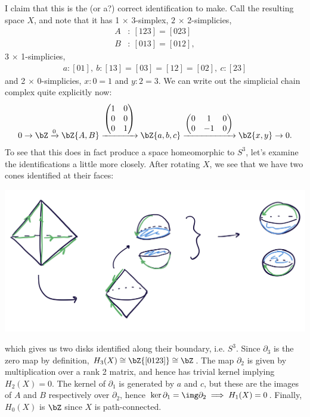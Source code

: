 \begin{homework}[e]
\begin{prf}
    I claim that this is the (or a?) correct identification to make. Call the resulting space $X$, and note that it has 1 $\times$ 3-simplex, $2$ $\times$ 2-simplicies,
    \begin{align*}
      A&: ~[123] = [023] \\
      B&: ~[013] = [012],
    \end{align*}
    3 $\times$ 1-simplicies,
    \begin{align*}
      a:[01], ~ b: [13] = [03] = [12] = [02], ~ c:[23]
    \end{align*}
    and 2 $\times$ 0-simplicies, $x: 0 = 1$ and $y: 2 = 3$. We can write out the simplicial chain complex quite explicitly now:
    \begin{align*}
      0 \to \bZ \xrightarrow{0} \bZ\{A,B\} \xrightarrow{
        \begin{pmatrix}	1 & 0 \\ 0 & 0 \\ 0 & 1  \end{pmatrix}
      } \bZ\{a,b,c\} \xrightarrow{
        \begin{pmatrix}	0 & 1 & 0 \\ 0 & -1 & 0 \end{pmatrix}
      } \bZ\{x,y\} \to 0.
    \end{align*}
    To see that this does in fact produce a space homeomorphic to $S^3$, let's examine the identifications a little more closely. After rotating $X$, we see that we have two cones identified at their faces:
    \begin{center}
      \includegraphics[width=15cm]{figures/hwk8-fig5.png}
      \label{fig:prob3-2}
    \end{center}
    which gives us two disks identified along their boundary, i.e. $S^3$. Since $\partial_3$ is the zero map by definition, $H_3(X) \cong \bZ\{[0123]\} \cong \bZ$. The map $\partial_2$ is given by multiplication over a rank 2 matrix, and hence has trivial kernel implying $H_2(X) = 0$. The kernel of $\partial_1$ is generated by $a$ and $c$, but these are the images of $A$ and $B$ respectively over $\partial_2$, hence $\ker\partial_1 = \img \partial_2\implies H_1(X) = 0$. Finally, $H_0(X)$ is $\bZ$ since $X$ is path-connected.


\end{prf}
\end{homework}
